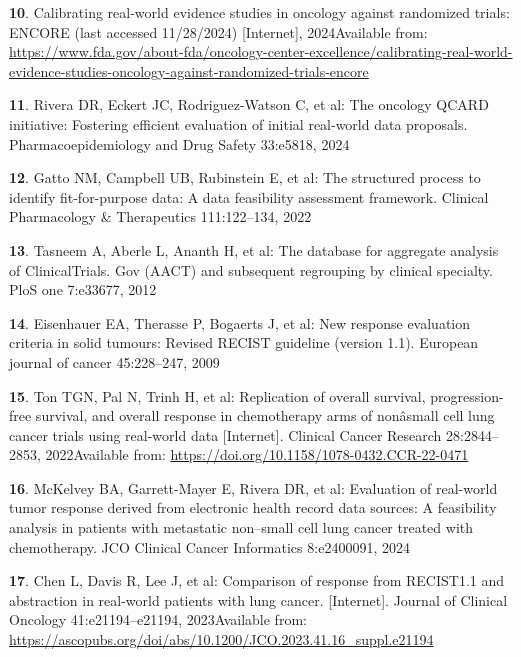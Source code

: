\documentclass[
  letterpaper,
  DIV=11,
  numbers=noendperiod]{scrartcl}
\newlength{\cslhangindent}
\newenvironment{CSLReferences}[2] %
 {\begin{list}{}{%
  \setlength{\itemindent}{0pt}
  \setlength{\leftmargin}{0pt}
  \setlength{\parsep}{0pt}
  \ifodd #1
   \setlength{\leftmargin}{\cslhangindent}
   \setlength{\itemindent}{-1\cslhangindent}
  \fi
  \setlength{\itemsep}{#2\baselineskip}}}
 {\end{list}}
\begin{document}
\begin{CSLReferences}{0}{1}
\textbf{10}. Calibrating real-world evidence studies in oncology against
randomized trials: ENCORE (last accessed 11/28/2024) {[}Internet{]},
2024Available from:
\url{https://www.fda.gov/about-fda/oncology-center-excellence/calibrating-real-world-evidence-studies-oncology-against-randomized-trials-encore}

\textbf{11}. Rivera DR, Eckert JC, Rodriguez-Watson C, et al: The
oncology QCARD initiative: Fostering efficient evaluation of initial
real-world data proposals. Pharmacoepidemiology and Drug Safety
33:e5818, 2024

\textbf{12}. Gatto NM, Campbell UB, Rubinstein E, et al: The structured
process to identify fit-for-purpose data: A data feasibility assessment
framework. Clinical Pharmacology \& Therapeutics 111:122--134, 2022

\textbf{13}. Tasneem A, Aberle L, Ananth H, et al: The database for
aggregate analysis of ClinicalTrials. Gov (AACT) and subsequent
regrouping by clinical specialty. PloS one 7:e33677, 2012

\textbf{14}. Eisenhauer EA, Therasse P, Bogaerts J, et al: New response
evaluation criteria in solid tumours: Revised RECIST guideline (version
1.1). European journal of cancer 45:228--247, 2009

\textbf{15}. Ton TGN, Pal N, Trinh H, et al: Replication of overall
survival, progression-free survival, and overall response in
chemotherapy arms of nonâsmall cell lung cancer trials using real-world
data {[}Internet{]}. Clinical Cancer Research 28:2844--2853,
2022Available from: \url{https://doi.org/10.1158/1078-0432.CCR-22-0471}

\textbf{16}. McKelvey BA, Garrett-Mayer E, Rivera DR, et al: Evaluation
of real-world tumor response derived from electronic health record data
sources: A feasibility analysis in patients with metastatic non--small
cell lung cancer treated with chemotherapy. JCO Clinical Cancer
Informatics 8:e2400091, 2024

\textbf{17}. Chen L, Davis R, Lee J, et al: Comparison of response from
RECIST1.1 and abstraction in real-world patients with lung cancer.
{[}Internet{]}. Journal of Clinical Oncology 41:e21194--e21194,
2023Available from:
\url{https://ascopubs.org/doi/abs/10.1200/JCO.2023.41.16_suppl.e21194}


\end{CSLReferences}
\end{document}
